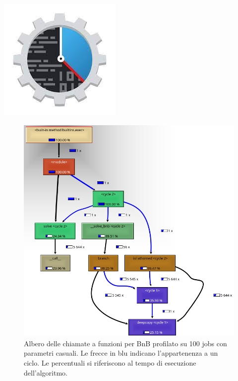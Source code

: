 \documentclass[compress]{beamer}
\begin{document}
    \begin{frame}{\subsecname \hfill \includegraphics[scale=0.1]{figs/kCacheGrindLogo.jpg}}
        \begin{figure}
            \includegraphics[scale=0.27]{../proofs/bnb_100_callstack.png}
            \caption[]{Albero delle chiamate a funzioni per BnB profilato su 100 jobs con parametri casuali.
            Le frecce in blu indicano l'appartenenza a un ciclo. Le percentuali si riferiscono
            al tempo di esecuzione dell'algoritmo.}
        \end{figure}        
    \end{frame}
\end{document}
